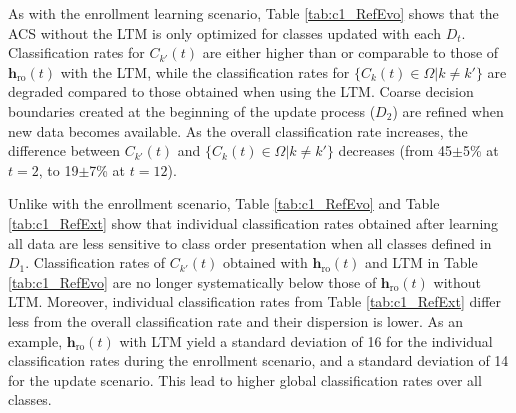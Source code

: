 As with the enrollment learning scenario, Table \ref{tab:c1_RefEvo} shows that the ACS without the LTM is only optimized for classes updated with each $D_t$. Classification rates for $C_{k'}(t)$ are either higher than or comparable to those of $\textbf{h}_\text{ro}(t)$ with the LTM, while the classification rates for $\{C_k(t)\in \Omega|k\neq k'\}$ are degraded compared to those obtained when using the LTM. Coarse decision boundaries created at the beginning of the update process ($D_2$) are refined when new data becomes available. As the overall classification rate increases, the difference between $C_{k'}(t)$ and $\{C_k(t)\in \Omega|k\neq k'\}$ decreases (from 45$\pm$5\% at $t=2$, to 19$\pm$7\% at $t=12$).

Unlike with the enrollment scenario, Table \ref{tab:c1_RefEvo} and Table \ref{tab:c1_RefExt} show that individual classification rates obtained after learning all data are less sensitive to class order presentation when all classes defined in $D_1$. Classification rates of $C_{k'}(t)$ obtained with $\textbf{h}_\text{ro}(t)$ and LTM in Table \ref{tab:c1_RefEvo} are no longer systematically below those of $\textbf{h}_\text{ro}(t)$ without LTM. Moreover, individual classification rates from Table \ref{tab:c1_RefExt} differ less from the overall classification rate and their dispersion is lower. As an example, $\textbf{h}_\text{ro}(t)$ with LTM yield a standard deviation of 16 for the individual classification rates during the enrollment scenario, and a standard deviation of 14 for the update scenario. This lead to higher global classification rates over all classes.

